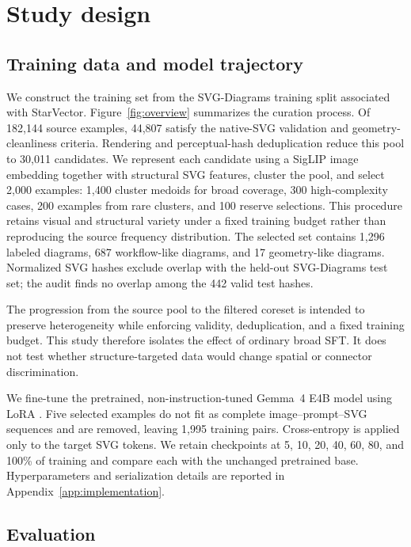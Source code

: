 \documentclass{article}
\begin{document}
\section{Study design}

\subsection{Training data and model trajectory}

We construct the training set from the SVG-Diagrams training split associated with StarVector. Figure~\ref{fig:overview} summarizes the curation process. Of 182,144 source examples, 44,807 satisfy the native-SVG validation and geometry-cleanliness criteria. Rendering and perceptual-hash deduplication reduce this pool to 30,011 candidates. We represent each candidate using a SigLIP image embedding together with structural SVG features, cluster the pool, and select 2,000 examples: 1,400 cluster medoids for broad coverage, 300 high-complexity cases, 200 examples from rare clusters, and 100 reserve selections. This procedure retains visual and structural variety under a fixed training budget rather than reproducing the source frequency distribution. The selected set contains 1,296 labeled diagrams, 687 workflow-like diagrams, and 17 geometry-like diagrams. Normalized SVG hashes exclude overlap with the held-out SVG-Diagrams test set; the audit finds no overlap among the 442 valid test hashes.

The progression from the source pool to the filtered coreset is intended to preserve heterogeneity while enforcing validity, deduplication, and a fixed training budget. This study therefore isolates the effect of ordinary broad SFT. It does not test whether structure-targeted data would change spatial or connector discrimination.

We fine-tune the pretrained, non-instruction-tuned Gemma~4 E4B model \citep{gemmateam2026gemma4} using LoRA \citep{hu2022lora}. Five selected examples do not fit as complete image--prompt--SVG sequences and are removed, leaving 1,995 training pairs. Cross-entropy is applied only to the target SVG tokens. We retain checkpoints at 5, 10, 20, 40, 60, 80, and 100\% of training and compare each with the unchanged pretrained base. Hyperparameters and serialization details are reported in Appendix~\ref{app:implementation}.

\subsection{Evaluation}
\end{document}
